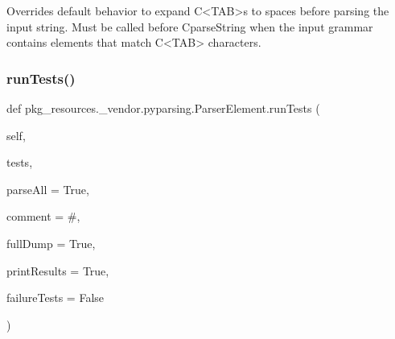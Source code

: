\begin{DoxyVerb}Overrides default behavior to expand C{<TAB>}s to spaces before parsing the input string.
Must be called before C{parseString} when the input grammar contains elements that
match C{<TAB>} characters.
\end{DoxyVerb}
 \mbox{\label{classpkg__resources_1_1__vendor_1_1pyparsing_1_1_parser_element_a9b310e792e7644f09f282e822487f333}} 
\subsubsection{\texorpdfstring{run\+Tests()}{runTests()}}
{\footnotesize\ttfamily def pkg\+\_\+resources.\+\_\+vendor.\+pyparsing.\+Parser\+Element.\+run\+Tests (\begin{DoxyParamCaption}\item[{}]{self,  }\item[{}]{tests,  }\item[{}]{parse\+All = {\ttfamily True},  }\item[{}]{comment = {\ttfamily \textquotesingle{}\#\textquotesingle{}},  }\item[{}]{full\+Dump = {\ttfamily True},  }\item[{}]{print\+Results = {\ttfamily True},  }\item[{}]{failure\+Tests = {\ttfamily False} }\end{DoxyParamCaption})}

